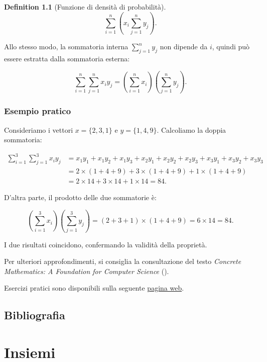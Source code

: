 \documentclass[
  letterpaper,
  DIV=11,
  numbers=noendperiod,
  oneside]{scrreprt}
\theoremstyle{definition}
\theoremstyle{plain}
\theoremstyle{definition}
\newtheorem{definition}{Definition}[chapter]
\theoremstyle{remark}
\begin{document}
\begin{definition}[Funzione di densità di
probabilità]
\[
\sum_{i=1}^{n} \left( x_i \sum_{j=1}^{n} y_j \right).
\]

Allo stesso modo, la sommatoria interna \(\sum_{j=1}^{n} y_j\) non
dipende da \(i\), quindi può essere estratta dalla sommatoria esterna:

\[
\sum_{i=1}^{n} \sum_{j=1}^{n} x_i y_j = \left( \sum_{i=1}^{n} x_i \right) \left( \sum_{j=1}^{n} y_j \right).
\]

\subsection{Esempio pratico}\label{esempio-pratico}

Consideriamo i vettori \(x = \{2, 3, 1\}\) e \(y = \{1, 4, 9\}\).
Calcoliamo la doppia sommatoria:

\[
\begin{aligned}
\sum_{i=1}^3 \sum_{j=1}^3 x_i y_j &= x_1 y_1 + x_1 y_2 + x_1 y_3 + x_2 y_1 + x_2 y_2 + x_2 y_3 + x_3 y_1 + x_3 y_2 + x_3 y_3 \\
&= 2 \times (1 + 4 + 9) + 3 \times (1 + 4 + 9) + 1 \times (1 + 4 + 9) \\
&= 2 \times 14 + 3 \times 14 + 1 \times 14 = 84.
\end{aligned}
\]

D'altra parte, il prodotto delle due sommatorie è:

\[
\left( \sum_{i=1}^3 x_i \right) \left( \sum_{j=1}^3 y_j \right) = (2 + 3 + 1) \times (1 + 4 + 9) = 6 \times 14 = 84.
\]

I due risultati coincidono, confermando la validità della proprietà.

Per ulteriori approfondimenti, si consiglia la consultazione del testo
\emph{Concrete Mathematics: A Foundation for Computer Science}
().

Esercizi pratici sono disponibili sulla seguente
\href{https://math.libretexts.org/Courses/Cosumnes_River_College/Math_370\%3A_Precalculus/07\%3A_Sequences_and_the_Binomial_Theorem/7.02\%3A_Summation_Notation/7.2E\%3A_Exercises}{pagina
web}.

\section*{Bibliografia}\label{bibliografia-12}


\chapter{Insiemi}\label{sec-apx-sets}


\end{definition}
\end{document}

